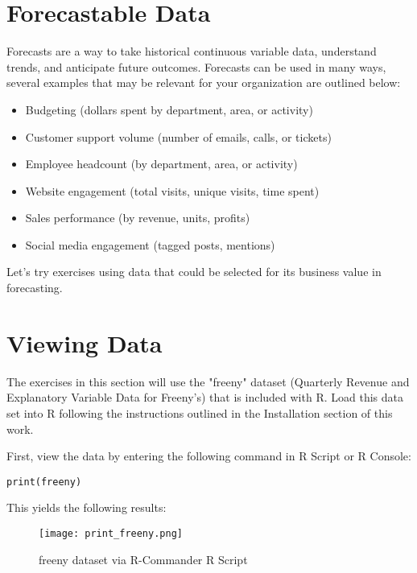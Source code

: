 %
%
%
%
%

\section{Forecastable Data}
Forecasts are a way to take historical continuous variable data, understand 
trends, and anticipate future outcomes. Forecasts can be used in many ways,
several examples that may be relevant for your organization are outlined below:

\begin{itemize}
 \item Budgeting (dollars spent by department, area, or activity)
 \item Customer support volume (number of emails, calls, or tickets)
 \item Employee headcount (by department, area, or activity)
 \item Website engagement (total visits, unique visits, time spent)
 \item Sales performance (by revenue, units, profits)
 \item Social media engagement (tagged posts, mentions)
\end{itemize}

Let's try exercises using data that could be selected for its business value 
in forecasting.

\section{Viewing Data}
The exercises in this section will use the "freeny" dataset (Quarterly Revenue and Explanatory Variable Data for Freeny's) that is included with R. Load this data set into R following the instructions outlined in the Installation section of this work.

First, view the data by entering the following command in R Script or R Console:

\texttt{print(freeny)}

This yields the following results:

\begin{figure}[h!]
\texttt{[image: print\_freeny.png]}
 \caption{freeny dataset via R-Commander R Script}
 \label{fig:print_freeny}
\end{figure}

